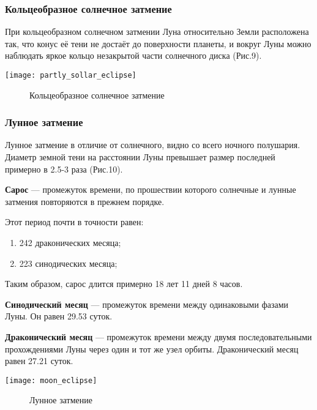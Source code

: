 \documentclass[10pt,a5paper]{article}
\begin{document}
\subsubsection*{Кольцеобразное солнечное затмение}
При кольцеобразном солнечном затмении Луна относительно Земли расположена так, что конус её тени не достаёт до поверхности планеты, и вокруг Луны можно наблюдать яркое кольцо незакрытой части солнечного диска (Рис.9).
\begin{center}
\texttt{[image: partly\_sollar\_eclipse]}
\begin{figure}[h!]
\caption{Кольцеобразное солнечное затмение}
\end{figure}
\end{center}
\subsubsection*{Лунное затмение}

Лунное затмение в отличие от солнечного, видно со всего ночного полушария. Диаметр земной тени на расстоянии Луны превышает размер последней примерно в 2.5-3 раза (Рис.10).

\textbf{Сарос} --- промежуток  времени, по прошествии которого солнечные и лунные затмения повторяются в прежнем порядке.

Этот период почти в точности равен:
\begin{enumerate}
\item 242 драконических месяца;
\item 223 синодических месяца;
\end{enumerate}

Таким образом, сарос длится примерно 18 лет 11 дней 8 часов.

\textbf{Синодический месяц} --- промежуток времени между одинаковыми фазами Луны. Он равен 29.53 суток.

\textbf{Драконический месяц} --- промежуток времени между двумя последовательными прохождениями Луны через один и тот же узел орбиты. Драконический месяц равен 27.21 суток.
\begin{center}
\texttt{[image: moon\_eclipse]}
\begin{figure}[h!]
\caption{Лунное затмение}
\end{figure}
\end{center}
\end{document}

